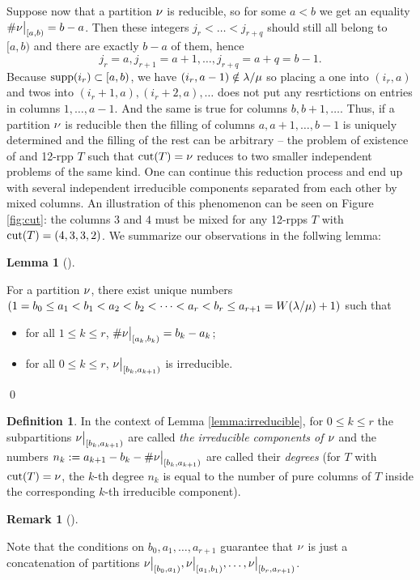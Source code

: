 \documentclass[numbers=enddot,12pt,final,onecolumn,notitlepage]{scrartcl}%
\theoremstyle{definition}
\newtheorem{lem}[theo]{Lemma}
\newenvironment{lemma}[1][]
{\begin{lem}[#1]\begin{leftbar}}
{\end{leftbar}\end{lem}}
\newtheorem{defi}[theo]{Definition}
\newtheorem{remk}[theo]{Remark}
\newenvironment{remark}[1][]
{\begin{remk}[#1]\begin{leftbar}}
{\end{leftbar}\end{remk}}
\begin{document}
Suppose now that a partition ${{\nu}}$ is reducible, so for some $a<b$ we get an equality $\#{{{\nu}}\big|_{[a,b)}}=b-a$. Then these integers $j_r<\dots<j_{r+q}$ should still all belong to $[a,b)$ and there are exactly $b-a$ of them, hence 
$$j_r=a,j_{r+1}=a+1,\dots,j_{r+q}=a+q=b-1.$$
Because ${\operatorname*{supp}}(i_r)\subset[a,b)$, we have $(i_r,a-1)\notin{\lambda/\mu}$ so placing a one into $(i_r,a)$ and twos into $(i_r+1,a),(i_r+2,a),\dots$ does not put any resrtictions on entries in columns $1,\dots, a-1$. And the same is true for columns $b,b+1,\dots$. Thus, if a partition ${{\nu}}$ is reducible then the filling of columns $a,a+1,\dots, b-1$ is uniquely determined and the filling of the rest can be arbitrary -- the problem of existence of and 12-rpp $T$ such that ${\operatorname*{cut}}(T)={{\nu}}$ reduces to two smaller independent problems of the same kind. One can continue this reduction process and end up with several independent irreducible components separated from each other by mixed columns. An illustration of this phenomenon can be seen on Figure \ref{fig:cut}: the columns $3$ and $4$ must be mixed for any 12-rpps $T$ with ${\operatorname*{cut}}(T)=(4,3,3,2)$. We summarize our observations in the follwing lemma:
\begin{lemma}
\label{lemma:irreducible}
 For a partition ${{\nu}}$, there exist unique numbers $(1=b_0\leq a_1<b_1<a_2<b_2<\dots<a_r<b_r\leq a_{r+1}=W({\lambda/\mu})+1)$ such that 
 \begin{itemize}
  \item for all $1\leq k\leq r$, $\#{{{\nu}}\big|_{[a_k,b_k)}} =b_k-a_k$;
  \item for all $0\leq k \leq r$, ${{{\nu}}\big|_{[b_k,a_{k+1})}}$ is irreducible.
 \end{itemize}
\end{lemma}\qed
\begin{defi}
 In the context of Lemma \ref{lemma:irreducible}, for $0\leq k\leq r$ the subpartitions ${{{\nu}}\big|_{[b_k,a_{k+1})}}$ are called \textit{the irreducible components of ${{\nu}}$} and the numbers $n_k:=a_{k+1}-b_k-\#{{{\nu}}\big|_{[b_k,a_{k+1})}}$ are called their \textit{degrees}  (for $T$ with ${\operatorname*{cut}}(T)={{\nu}}$, the $k$-th degree $n_k$ is equal to the number of pure columns of $T$ inside the corresponding $k$-th irreducible component).
\end{defi}
\begin{remark}
 Note that the conditions on $b_0,a_1,\dots,a_{r+1}$ guarantee that ${{\nu}}$ is just a concatenation of partitions ${{{\nu}}\big|_{[b_0,a_1)}},{{{\nu}}\big|_{[a_1,b_1)}},\dots,{{{\nu}}\big|_{[b_r,a_{r+1})}}$. 
\end{remark}
\end{document}
